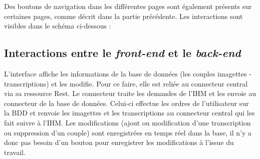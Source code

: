 Des boutons de navigation dans les différentes pages sont également présents sur certaines pages, comme décrit dans la partie précédente. Les interactions sont visibles dans le schéma ci-dessous :


\subsection{Interactions entre le \textit{front-end} et le \textit{back-end}}

L’interface affiche les informations de la base de données (les couples imagettes - transcriptions) et les modifie. Pour ce faire, elle est reliée au connecteur central via sa ressource Rest. Le connecteur traite les demandes de l’IHM et les envoie au connecteur de la base de données. Celui-ci effectue les ordres de l’utilisateur sur la BDD et renvoie les imagettes et les transcriptions au connecteur central qui les fait suivre à l’IHM. Les modifications (ajout ou modification d’une transcription ou suppression d’un couple) sont enregistrées en temps réel dans la base, il n’y a donc pas besoin d’un bouton pour enregistrer les modifications à l’issue du travail.

